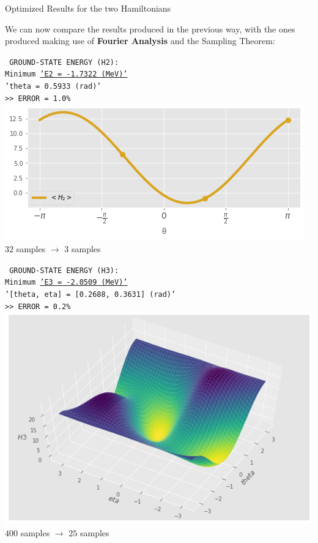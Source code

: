 \documentclass[9pt, handout, aspectratio=169]{beamer}		%
\begin{document}
	\begin{frame}{Optimized Results for the two Hamiltonians}

		We can now compare the results produced in the previous way, with the ones produced making use of \textbf{Fourier Analysis} and the Sampling Theorem:

		\begin{multicols}{2}

			\begin{center}
				\texttt{ \small
					GROUND-STATE ENERGY (H2): \\
					Minimum \underline{'E2 = -1.7322 (MeV)'} \\
					'theta = 0.5933 (rad)' \\
					>> ERROR = 1.0\% } \\
				\smallskip
				\includegraphics[width=.34\paperwidth]{Figures/h2_optimization} \\
				\small{$32$ samples $\rightarrow$ $3$ samples}
			\end{center}

			\columnbreak

			\begin{center}
				\texttt{ \small
					GROUND-STATE ENERGY (H3): \\
					Minimum \underline{'E3 = -2.0509 (MeV)'} \\
					'[theta, eta] = [0.2688, 0.3631] (rad)' \\
					>> ERROR = 0.2\% } \\
				\smallskip
				\includegraphics[width=.34\paperwidth]{Figures/h3_optimization} \\
				\small{$400$ samples $\rightarrow$ $25$ samples}
			\end{center}


\end{multicols}
\end{frame}
\end{document}
